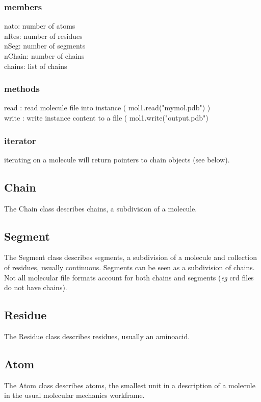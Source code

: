 \documentclass[11pt,twoside,onecolumn,a4paper,openright,notitlepage]{book}[2001/04/21]
\begin{document}
\subsubsection{members}
nato: number of atoms\\
nRes: number of residues\\
nSeg: number of segments\\
nChain: number of chains\\
chains: list of chains\\
\subsubsection{methods}
read : read molecule file into instance ( mol1.read("mymol.pdb") )\\
write : write instance content to a file ( mol1.write("output.pdb")\\
\subsubsection{iterator}
iterating on a molecule will return pointers to chain objects (see below).

\subsection{Chain}
The Chain class describes chains, a subdivision of a molecule.

\subsection{Segment}
The Segment class describes segments, a subdivision of a molecule and collection of residues, usually continuous. Segments can be seen as a subdivision of chains. Not all molecular file formats account for both chains and segments (\emph{eg} crd files do not have chains).

\subsection{Residue}
The Residue class describes residues, usually an aminoacid.

\subsection{Atom}
The Atom class describes atoms, the smallest unit in a description of a molecule in the usual molecular mechanics workframe.
\end{document}
